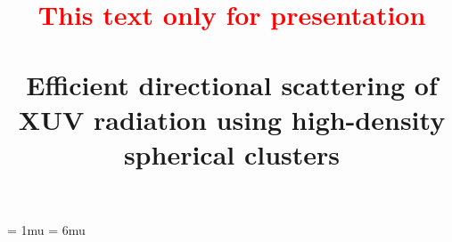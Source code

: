 \documentclass[10pt]{article}
\begin{document}



	\pagestyle{fancy}
	\fancyhf{}
	\fancyhead[L]{\textit{\nouppercase{\leftmark}}}
	\fancyfoot[C]{\thepage}

	\thinmuskip = 1mu
	\thickmuskip = 6mu

	\renewcommand{\equationautorefname}{}


	\title{\textcolor{red}{This text only for presentation} \\ ~ \\ Efficient directional scattering of XUV radiation using high-density spherical clusters}
	\author{}
	\maketitle


	
	
\end{document}
